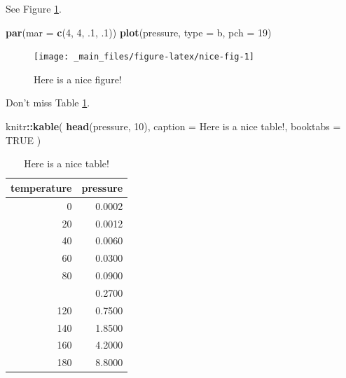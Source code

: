\documentclass[
]{book}
\newenvironment{Shaded}{\begin{snugshade}}{\end{snugshade}}
\newcommand{\AttributeTok}[1]{\textcolor[rgb]{0.13,0.29,0.53}{#1}}
\newcommand{\ConstantTok}[1]{\textcolor[rgb]{0.56,0.35,0.01}{#1}}
\newcommand{\DecValTok}[1]{\textcolor[rgb]{0.00,0.00,0.81}{#1}}
\newcommand{\FunctionTok}[1]{\textcolor[rgb]{0.13,0.29,0.53}{\textbf{#1}}}
\newcommand{\NormalTok}[1]{#1}
\newcommand{\SpecialCharTok}[1]{\textcolor[rgb]{0.81,0.36,0.00}{\textbf{#1}}}
\newcommand{\StringTok}[1]{\textcolor[rgb]{0.31,0.60,0.02}{#1}}
\theoremstyle{definition}
\theoremstyle{definition}
\theoremstyle{definition}
\theoremstyle{definition}
\theoremstyle{remark}
\begin{document}
See Figure \ref{fig:nice-fig}.

\begin{Shaded}
\begin{Highlighting}[]
\FunctionTok{par}\NormalTok{(}\AttributeTok{mar =} \FunctionTok{c}\NormalTok{(}\DecValTok{4}\NormalTok{, }\DecValTok{4}\NormalTok{, .}\DecValTok{1}\NormalTok{, .}\DecValTok{1}\NormalTok{))}
\FunctionTok{plot}\NormalTok{(pressure, }\AttributeTok{type =} \StringTok{\textquotesingle{}b\textquotesingle{}}\NormalTok{, }\AttributeTok{pch =} \DecValTok{19}\NormalTok{)}
\end{Highlighting}
\end{Shaded}

\begin{figure}

{\centering \texttt{[image: \_main\_files/figure-latex/nice-fig-1]} 

}

\caption{Here is a nice figure!}\label{fig:nice-fig}
\end{figure}

Don't miss Table \ref{tab:nice-tab}.

\begin{Shaded}
\begin{Highlighting}[]
\NormalTok{knitr}\SpecialCharTok{::}\FunctionTok{kable}\NormalTok{(}
  \FunctionTok{head}\NormalTok{(pressure, }\DecValTok{10}\NormalTok{), }\AttributeTok{caption =} \StringTok{\textquotesingle{}Here is a nice table!\textquotesingle{}}\NormalTok{,}
  \AttributeTok{booktabs =} \ConstantTok{TRUE}
\NormalTok{)}
\end{Highlighting}
\end{Shaded}

\begin{table}

\caption{\label{tab:nice-tab}Here is a nice table!}
\centering
\begin{tabular}[t]{rr}
\toprule
temperature & pressure\\
\midrule
0 & 0.0002\\
20 & 0.0012\\
40 & 0.0060\\
60 & 0.0300\\
80 & 0.0900\\
\addlinespace
100 & 0.2700\\
120 & 0.7500\\
140 & 1.8500\\
160 & 4.2000\\
180 & 8.8000\\
\bottomrule
\end{tabular}
\end{table}
\end{document}
